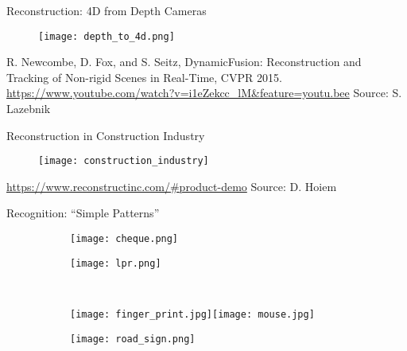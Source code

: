 \begin{frame}{Reconstruction: 4D from Depth Cameras}
    \begin{figure}[ht]
        \centering
        \texttt{[image: depth\_to\_4d.png]}
    \end{figure}
    R. Newcombe, D. Fox, and S. Seitz, DynamicFusion: Reconstruction and Tracking of Non-rigid Scenes in Real-Time, CVPR 2015.
    \url{https://www.youtube.com/watch?v=i1eZekcc\_lM&feature=youtu.bee}
    \vfill
    \scriptsize{Source: S. Lazebnik}
\end{frame}


\begin{frame}{Reconstruction in Construction Industry}
    \begin{figure}[ht]
        \centering
        \texttt{[image: construction\_industry]}
    \end{figure}
    \url{https://www.reconstructinc.com/\#product-demo}
    \vfill
    \scriptsize{Source: D. Hoiem}
\end{frame}



\begin{frame}{Recognition: ``Simple Patterns''}
    \begin{figure}[ht]
      \centering
      \begin{subfigure}[b]{0.45\linewidth}
        \centering\texttt{[image: cheque.png]}
        \caption{}\label{sf:cheque}
      \end{subfigure}%
      \begin{subfigure}[b]{0.45\linewidth}
        \centering\texttt{[image: lpr.png]}
        \caption{}\label{sf:lpr}
      \end{subfigure}\\
      \begin{subfigure}[b]{0.45\linewidth}
        \centering\texttt{[image: finger\_print.jpg]}\texttt{[image: mouse.jpg]}
        \caption{}\label{sf:mouse}
      \end{subfigure}
      \begin{subfigure}[b]{0.45\linewidth}
        \centering\texttt{[image: road\_sign.png]}
        \caption{}\label{sf:sign}
      \end{subfigure}
      \caption{}
    \end{figure}
\end{frame}



